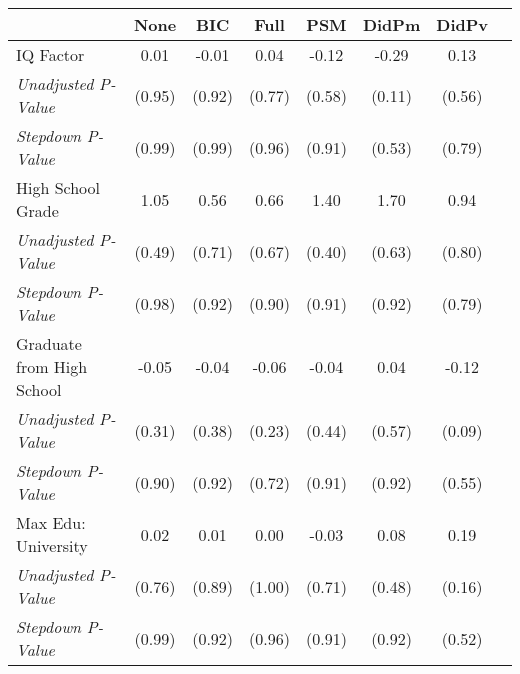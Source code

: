 \begin{tabular}{l c c c c c c c}
\toprule
 & None & BIC & Full & PSM & DidPm & DidPv \\
\midrule
IQ Factor & 0.01 & -0.01 & 0.04 & -0.12 & -0.29 & 0.13 \\
\quad \textit{Unadjusted P-Value} & (0.95) & (0.92) & (0.77) & (0.58) & (0.11) & (0.56) \\
\quad \textit{Stepdown P-Value} & (0.99) & (0.99) & (0.96) & (0.91) & (0.53) & (0.79) \\
High School Grade & 1.05 & 0.56 & 0.66 & 1.40 & 1.70 & 0.94 \\
\quad \textit{Unadjusted P-Value} & (0.49) & (0.71) & (0.67) & (0.40) & (0.63) & (0.80) \\
\quad \textit{Stepdown P-Value} & (0.98) & (0.92) & (0.90) & (0.91) & (0.92) & (0.79) \\
Graduate from High School & -0.05 & -0.04 & -0.06 & -0.04 & 0.04 & -0.12 \\
\quad \textit{Unadjusted P-Value} & (0.31) & (0.38) & (0.23) & (0.44) & (0.57) & (0.09) \\
\quad \textit{Stepdown P-Value} & (0.90) & (0.92) & (0.72) & (0.91) & (0.92) & (0.55) \\
Max Edu: University & 0.02 & 0.01 & 0.00 & -0.03 & 0.08 & 0.19 \\
\quad \textit{Unadjusted P-Value} & (0.76) & (0.89) & (1.00) & (0.71) & (0.48) & (0.16) \\
\quad \textit{Stepdown P-Value} & (0.99) & (0.92) & (0.96) & (0.91) & (0.92) & (0.52) \\
\bottomrule
\end{tabular}
